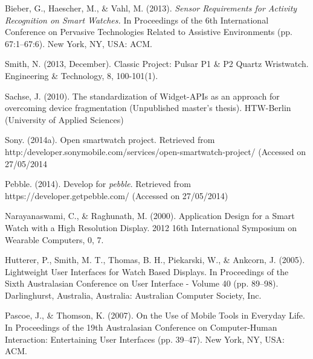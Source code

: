 \documentclass[10pt,a4paper]{article}
\begin{document}
\begin{thebibliography}{8}
  
 Bieber, G., Haescher, M., \& Vahl, M.  (2013).  \textit{Sensor Requirements for Activity Recognition on Smart Watches.}  In Proceedings of the 6th International Conference on Pervasive Technologies Related to Assistive Environments (pp. 67:1–67:6).  New York, NY, USA: ACM.

 Smith, N.  (2013, December).  Classic Project:  Pulsar P1 \& P2 Quartz Wristwatch. Engineering \& Technology, 8, 100-101(1).

 Sachse, J.  (2010). The standardization of Widget-APIs as an approach for overcoming device fragmentation (Unpublished master’s thesis).  HTW-Berlin (University of Applied Sciences)

 Sony.  (2014a). Open smartwatch project. Retrieved from http:/developer.sonymobile.com/services/open-smartwatch-project/ (Accessed on 27/05/2014

 Pebble.  (2014). Develop for \textit{pebble}. Retrieved from https://developer.getpebble.com/ (Accessed on 27/05/2014)

 Narayanaswami, C., \& Raghunath, M.  (2000).  Application Design for a Smart Watch with a High Resolution Display. 2012 16th International Symposium on Wearable Computers, 0, 7.

Hutterer, P., Smith, M. T., Thomas, B. H., Piekarski, W., \& Ankcorn, J.  (2005).  Lightweight User Interfaces for Watch Based Displays.  In Proceedings of the Sixth Australasian Conference on User Interface - Volume 40 (pp. 89–98).  Darlinghurst, Australia, Australia: Australian Computer Society, Inc.

Pascoe, J., \& Thomson, K.  (2007).  On the Use of Mobile Tools in Everyday Life.  In Proceedings of the 19th Australasian Conference on Computer-Human Interaction:  Entertaining User Interfaces (pp. 39–47).  New York, NY, USA: ACM.

\end{thebibliography}
\end{document}
